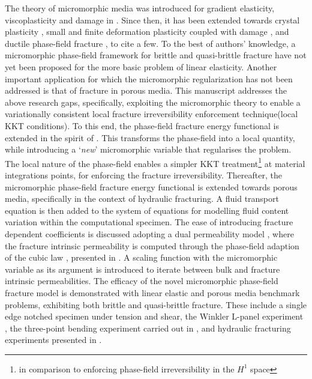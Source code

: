 \documentclass[11pt]{article}
\begin{document}
The theory of micromorphic media was introduced for gradient elasticity, viscoplasticity and damage in \cite{forest2009micromorphic}. Since then, it has been extended towards crystal plasticity \cite{Forest2014,ASLAN20111311,LINDROOS2022103187}, small and finite deformation plasticity coupled with damage \cite{GRAMMENOUDIS2010140,GRAMMENOUDIS2009957}, and ductile phase-field fracture \cite{Miehe2016micromorphic}, to cite a few. To the best of authors' knowledge, a micromorphic phase-field framework for brittle and quasi-brittle fracture have not yet been proposed for the more basic problem of linear elasticity. Another important application for which the micromorphic regularization has not been addressed is that of fracture in porous media. This manuscript addresses the above research gaps, specifically, exploiting the micromorphic theory to enable a variationally consistent local fracture irreversibility enforcement technique(local KKT conditions). To this end, the phase-field fracture energy functional is extended in the spirit of \cite{forest2009micromorphic}. This transforms the phase-field into a local quantity, while introducing a `\textit{new}' micromorphic variable that regularises the problem. The local nature of the phase-field enables a simpler KKT treatment\footnote{in comparison to enforcing phase-field irreversibility in the $H^1$ space} at material integrations points, for enforcing the fracture irreversibility. Thereafter, the micromorphic phase-field fracture energy functional is extended towards porous media, specifically in the context of hydraulic fracturing. A fluid transport equation is then added to the system of equations for modelling fluid content variation within the computational specimen. The ease of introducing fracture dependent coefficients is discussed adopting a dual permeability model \cite{Gerke1993dualporosity,Lee1999}, where the fracture intrinsic permeability is computed through the phase-field adaption of the cubic law \cite{Witherspoon1980cubic}, presented in \cite{MIEHE2015186Biot}. A scaling function with the micromorphic variable as its argument is introduced to iterate between bulk and fracture intrinsic permeabilities. The efficacy of the novel micromorphic phase-field fracture model is demonstrated with linear elastic and porous media benchmark problems, exhibiting both brittle and quasi-brittle fracture. These include a single edge notched specimen under tension and shear, the Winkler L-panel experiment \cite{winkler2001traglastuntersuchungen}, the three-point bending experiment carried out in \cite{Rots1988}, and hydraulic fracturing experiments presented in \cite{Mikelic2015fluidfrac}.
\end{document}

